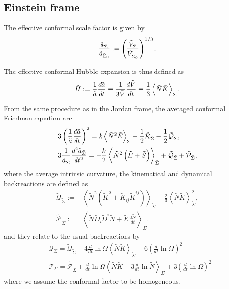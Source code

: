 \subsection{Einstein frame}

The effective conformal scale factor is given by
\begin{equation}
    \frac{\Tilde{a}_{\Tilde{\Sigma}}}{\Tilde{a}_{\Tilde{\Sigma}_0}}:=\left(\frac{\Tilde{V}_{\Tilde{\Sigma}}}{\Tilde{V}_{\Tilde{\Sigma}_0}}\right)^{1/3}.
\end{equation}

The effective conformal Hubble expansion is thus defined as
\begin{equation}
    \Tilde{H} := \frac{1}{\Tilde{a}}\frac{d\Tilde{a}}{dt}\equiv \frac{1}{3\Tilde{V}}\frac{d\Tilde{V}}{dt}\equiv\frac{1}{3}\left\langle \Tilde{N}\Tilde{K} \right\rangle_{\Tilde{\Sigma}}.
\end{equation}

From the same procedure as in the Jordan frame, the averaged conformal Friedman equation are
\begin{align}
    &3\left(\frac{1}{\Tilde{a}}\frac{d\Tilde{a}}{dt}\right)^2 = k\left\langle \Tilde{N}^2\Tilde{E}\right\rangle_{\Tilde{\Sigma}}-\frac{1}{2}\Tilde{\mathcal{R}}_{\Tilde{\Sigma}}-\frac{1}{2}\Tilde{\mathcal{Q}}_{\Tilde{\Sigma}},\\
    &3\frac{1}{\Tilde{a}_{\Tilde{\Sigma}}}\frac{d^2\Tilde{a}_{\Tilde{\Sigma}}}{dt^2}=-\frac{k}{2}\left\langle \Tilde{N}^2\left(\Tilde{E}+\Tilde{S}\right)\right\rangle_{\Tilde{\Sigma}}+\Tilde{\mathcal{Q}}_{\Tilde{\Sigma}}+\Tilde{\mathcal{P}}_{\Tilde{\Sigma}},
\end{align}
where the average intrinsic curvature, the kinematical and dynamical backreactions are defined as
\begin{align}
    \tilde{\mathcal{Q}}_{\tilde{\Sigma}}:=& \left\langle \tilde{N}^2\left(\tilde{K}^2+\tilde{K}_{ij}\tilde{K}^{ij}\right)\right\rangle_{\tilde{\Sigma}}-\frac{2}{3}\left\langle \tilde{N}\tilde{K}\right\rangle_{\tilde{\Sigma}}^2, \\
    \tilde{\mathcal{P}}_{\tilde{\Sigma}}:=&\left\langle \tilde{N} \tilde{D}_i \tilde{D}^i \tilde{N}+\tilde{K}\frac{d\tilde{N}}{dt}\right\rangle_{\tilde{\Sigma}}.
\end{align}
and they relate to the usual backreactions by
\begin{align}
    &\mathcal{Q}_\Sigma = \tilde{\mathcal{Q}}_{\tilde{\Sigma}} - 4 \frac{d}{dt}\ln\Omega\left\langle  \tilde{N}\tilde{K}\right\rangle_{\tilde{\Sigma}}+6\left(\frac{d}{dt}\ln\Omega\right)^2\\
    &\mathcal{P}_\Sigma = \tilde{\mathcal{P}}_{\tilde{\Sigma}}+\frac{d}{dt}\ln\Omega\left\langle \tilde{N}\tilde{K}+3\frac{d}{dt}\ln\tilde{N}\right\rangle_{\tilde{\Sigma}}+3\left(\frac{d}{dt}\ln\Omega\right)^2
\end{align}
where we assume the conformal factor to be homogeneous.

